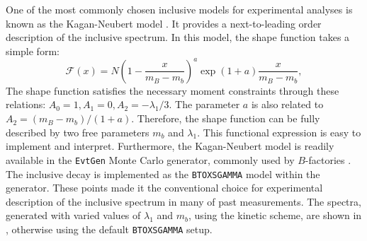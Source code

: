 One of the most commonly chosen inclusive \BtoXsgamma models for experimental analyses is known as the Kagan-Neubert model \cite{Kagan:1998ym}.
It provides a next-to-leading order description of the inclusive \BtoXsgamma spectrum. 
In this model, the shape function takes a simple form:
\begin{equation}
    \mathcal{F}(x) = N\left(1-\frac{x}{m_B-m_b}\right)^a\exp{(1+a)\frac{x}{m_B-m_b}},
\end{equation}
The shape function satisfies the necessary moment constraints through these relations: $A_0=1,A_1 = 0,A_2=-\lambda_1/3$.
The parameter $a$ is also related to $A_2=(m_B-m_b)/(1+a)$.
Therefore, the shape function can be fully described by two free parameters $m_b$ and $\lambda_1$.
This functional expression is easy to implement and interpret.
Furthermore, the Kagan-Neubert model is readily available in the \texttt{EvtGen} Monte Carlo generator, commonly used by $B$-factories \cite{Ryd:2005zz}.
The \BtoXsgamma inclusive decay is implemented as the \texttt{BTOXSGAMMA} model within the generator. 
These points made it the conventional choice for experimental description of the inclusive \Egamma spectrum in many of past measurements.
The spectra, generated with varied values of $\lambda_1$ and $m_b$, using the kinetic scheme, are shown in , otherwise using the default \texttt{BTOXSGAMMA} setup.
